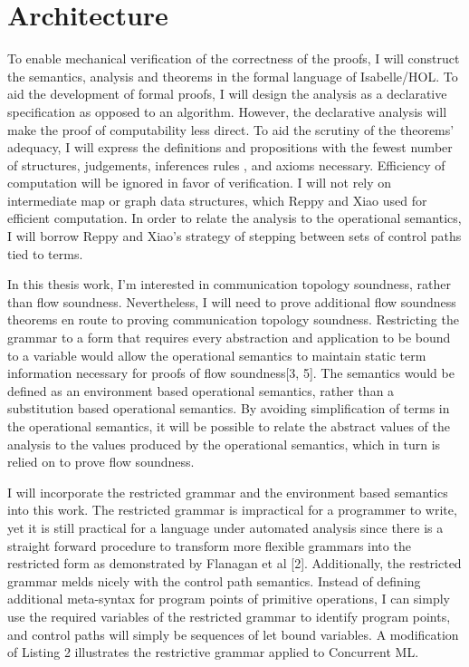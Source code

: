 \documentclass{article}
\begin{document}
\section{Architecture}
To enable mechanical verification of the correctness of the proofs, I will construct the
semantics, analysis and theorems in the formal language of Isabelle/HOL.  To aid the
development of formal proofs, I will design the analysis as a declarative specification as
opposed to an algorithm.  However, the declarative analysis will make the proof of
computability less direct.  To aid the scrutiny of the theorems' adequacy, I will express the
definitions and propositions with the fewest number of structures, judgements, inferences rules
, and axioms necessary.  Efficiency of computation will be ignored in favor of verification.
I will not rely on intermediate map or graph data structures, which Reppy and Xiao used for
efficient computation.  In order to relate the analysis to the operational semantics, I will
borrow Reppy and Xiao's strategy of stepping between sets of control paths tied to terms.

In this thesis work, I'm interested in communication topology soundness, rather than flow
soundness.  Nevertheless, I will need to prove additional flow soundness theorems en route to
proving communication topology soundness.  Restricting the grammar to a form that requires
every abstraction and application to be bound to a variable would allow the operational
semantics to maintain static term information necessary for proofs of flow soundness[3, 5].
The semantics would be defined as an environment based operational semantics, rather than a
substitution based operational semantics.  By avoiding simplification of terms in the
operational semantics, it will be possible to relate the abstract values of the analysis to the
values produced by the operational semantics, which in turn is relied on to prove flow
soundness.


I will incorporate the restricted grammar and the environment based semantics into this work.
The restricted grammar is impractical for a programmer to write, yet it is still practical for
a language under automated analysis since there is a straight forward procedure to transform
more flexible grammars into the restricted form as demonstrated by Flanagan et al [2].
Additionally, the restricted grammar melds nicely with the control path semantics.  Instead of
defining additional meta-syntax for program points of primitive operations, I can simply use
the required variables of the restricted grammar to identify program points, and control paths
will simply be sequences of let bound variables. A modification of Listing 2 illustrates the
restrictive grammar applied to Concurrent ML.
\end{document}
